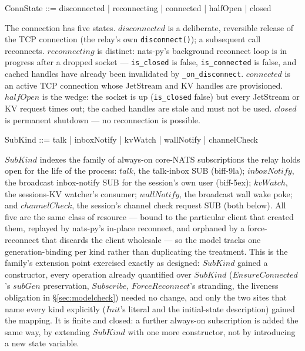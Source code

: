 \documentclass[a4paper,10pt,fleqn]{article}
\begin{document}
\begin{zed}
  ConnState ::= disconnected | reconnecting | connected | halfOpen | closed
\end{zed}

The connection has five states.  $disconnected$ is a deliberate,
reversible release of the TCP connection (the relay's own
\texttt{disconnect()}); a subsequent call reconnects.
$reconnecting$ is distinct: nats-py's background reconnect loop is
in progress after a dropped socket --- \texttt{is\_closed} is
false, \texttt{is\_connected} is false, and cached handles have
already been invalidated by \texttt{\_on\_disconnect}.
$connected$ is an active TCP connection whose JetStream and KV
handles are provisioned.  $halfOpen$ is the wedge: the socket is
up (\texttt{is\_closed} false) but every JetStream or KV request
times out; the cached handles are stale and must not be used.
$closed$ is permanent shutdown --- no reconnection is possible.

\begin{zed}
  SubKind ::= talk | inboxNotify | kvWatch | wallNotify | channelCheck
\end{zed}

$SubKind$ indexes the family of always-on core-NATS subscriptions the
relay holds open for the life of the process: $talk$, the talk-inbox SUB
(biff-9la); $inboxNotify$, the broadcast inbox-notify SUB for the
session's own user (biff-5ex); $kvWatch$, the sessions-KV watcher's
consumer; $wallNotify$, the broadcast wall wake poke; and $channelCheck$,
the session's channel check request SUB (both below).
All five are the same class of resource --- bound to
the particular client that created them, replayed by nats-py's in-place
reconnect, and orphaned by a force-reconnect that discards the client
wholesale --- so the model tracks one generation-binding per kind rather
than duplicating the treatment.  This is the family's extension point
exercised exactly as designed: $SubKind$ gained a constructor, every
operation already quantified over $SubKind$ ($EnsureConnected$'s $subGen$
preservation, $Subscribe$, $ForceReconnect$'s stranding, the liveness
obligation in \S\ref{sec:modelcheck}) needed no change, and only the two
sites that name every kind explicitly ($Init$'s literal and the
initial-state description) gained the mapping.  It is finite and closed:
a further always-on subscription is added the same way, by extending
$SubKind$ with one more constructor, not by introducing a new state
variable.
\end{document}
